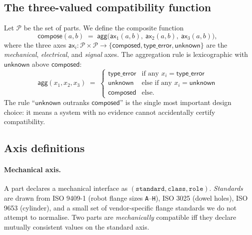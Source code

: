 \subsection{The three-valued compatibility function}

Let $\mathcal{P}$ be the set of parts. We define the composite
function
\begin{equation}
  \mathsf{compose}(a, b) \;=\;
    \mathsf{agg}\!\bigl(\mathsf{ax}_1(a,b),\
    \mathsf{ax}_2(a,b),\ \mathsf{ax}_3(a,b)\bigr),
  \label{eq:compose}
\end{equation}
where the three axes $\mathsf{ax}_i : \mathcal{P}\times\mathcal{P}
\to \{\mathsf{composed}, \mathsf{type\_error}, \mathsf{unknown}\}$
are the \emph{mechanical}, \emph{electrical}, and \emph{signal}
axes. The aggregation rule is lexicographic with $\mathsf{unknown}$
above $\mathsf{composed}$:
\begin{equation}
  \mathsf{agg}(x_1, x_2, x_3) \;=\;
  \begin{cases}
    \mathsf{type\_error} & \text{if any } x_i = \mathsf{type\_error}\\
    \mathsf{unknown}     & \text{else if any } x_i = \mathsf{unknown}\\
    \mathsf{composed}    & \text{else.}
  \end{cases}
  \label{eq:agg}
\end{equation}
The rule ``$\mathsf{unknown}$ outranks $\mathsf{composed}$'' is the
single most important design choice: it means a system with no
evidence cannot accidentally certify compatibility.

\subsection{Axis definitions}

\paragraph{Mechanical axis.}
A part declares a mechanical interface as
$(\texttt{standard}, \texttt{class}, \texttt{role})$. \emph{Standards}
are drawn from ISO 9409-1 (robot flange sizes \texttt{A}--\texttt{H}),
ISO 3025 (dowel holes), ISO 9653 (cylinder), and a small set of
vendor-specific flange standards we do not attempt to normalise.
Two parts are \emph{mechanically} compatible iff they declare
mutually consistent values on the standard axis.

